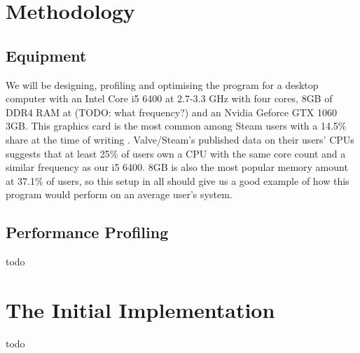 \documentclass[11pt, a4paper, twocolumn]{article}
\begin{document}
\section{Methodology}


\subsection{Equipment}

We will be designing, profiling and optimising the program for a desktop computer with an Intel Core i5 6400 at 2.7-3.3 GHz with four cores, 8GB of DDR4 RAM at (TODO: what frequency?) and an Nvidia Geforce GTX 1060 3GB. This  graphics card is the most common among Steam users with a 14.5\% share at the time of writing \citep{SteamSurvey}. Valve/Steam's published data on their users' CPUs suggests that at least 25\% of users own a CPU with the same core count and a similar frequency as our i5 6400. 8GB is also the most popular memory amount at 37.1\% of users, so this setup in all should give us a good example of how this program would perform on an average user's system.



\subsection{Performance Profiling}

todo

\section{The Initial Implementation}

todo
\end{document}
